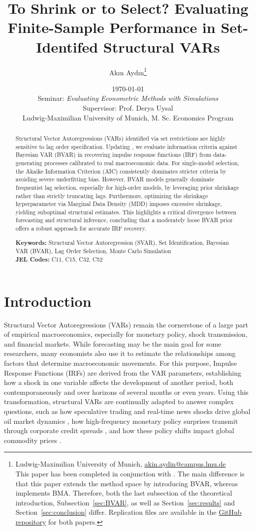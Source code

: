 \documentclass[12pt, a4paper]{article}
\title{To Shrink or to Select? Evaluating Finite-Sample Performance in Set-Identifed Structural VARs}
\author{
    Ak\i n Ayd\i n\thanks{Ludwig-Maximilian University of Munich, \href{mailto:akin.aydin@campus.lmu.de}{akin.aydin@campus.lmu.de} \\ This paper has been completed in conjunction with \citet{LoserBMA2026}. The main difference is that this paper extends the method space by introducing BVAR, whereas \citet{LoserBMA2026} implements BMA. Therefore, both the last subsection of the theoretical introduction, Subsection~\ref{sec:BVAR}, as well as Section~\ref{sec:results} and Section~\ref{sec:conclusion} differ. Replication files are available in the \href{https://github.com/FerdinandLos/Monte-Carlo-Coding}{GitHub repository} for both papers.} 
}
\date{\today \\ \vspace{0.5cm} Seminar: \textit{Evaluating Econometric Methods with Simulations} \\ Supervisor: Prof. Derya Uysal \\ \vspace{0.5cm} Ludwig-Maximilian University of Munich, M. Sc. Economics Program}
\begin{document}
\maketitle

\begin{abstract}
\noindent
Structural Vector Autoregressions (VARs) identified via set restrictions are highly sensitive to lag order specification. Updating \citet{ivanovPractitionersGuideLag2005}, we evaluate information criteria against Bayesian VAR (BVAR) in recovering impulse response functions (IRF) from data-generating processes calibrated to real macroeconomic data. For single-model selection, the Akaike Information Criterion (AIC) consistently dominates stricter criteria by avoiding severe underfitting bias. However, BVAR models generally dominate frequentist lag selection, especially for high-order models, by leveraging prior shrinkage rather than strictly truncating lags. Furthermore, optimizing the shrinkage hyperparameter via Marginal Data Density (MDD) imposes excessive shrinkage, yielding suboptimal structural estimates. This highlights a critical divergence between forecasting and structural inference, concluding that a moderately loose BVAR prior offers a robust approach for accurate IRF recovery.

\vspace{1em}
\noindent\textbf{Keywords:} Structural Vector Autoregression (SVAR), Set Identification, Bayesian VAR (BVAR), Lag Order Selection, Monte Carlo Simulation \\
\noindent\textbf{JEL Codes:} C11, C15, C32, C52 %
\end{abstract}

\newpage

\section{Introduction}
\label{sec:introduction}

Structural Vector Autoregressions (VARs) remain the cornerstone of a large part of empirical macroeconomics, especially for monetary policy, shock transmission, and financial markets. While forecasting may be the main goal for some researchers, many economists also use it to estimate the relationships among factors that determine macroeconomic movements. For this purpose, Impulse Response Functions (IRFs) are derived from the VAR parameters, establishing how a shock in one variable affects the development of another period, both contemporaneously and over horizons of several months or even years. Using this transformation, structural VARs are continually adapted to answer complex questions, such as how speculative trading and real-time news shocks drive global oil market dynamics \citep{kilianRoleInventoriesSpeculative2014, gazzaniOilPriceShocks2024, castelnuovoCommodityPriceShocks2024}, how high-frequency monetary policy surprises transmit through corporate credit spreads \citep{gertlerMonetaryPolicySurprises2015, ferreiraFirmFinancialConditions2023}, and how these policy shifts impact global commodity prices \citep{miranda-pintoMonetaryPolicyTransmission2023}. 
\end{document}
